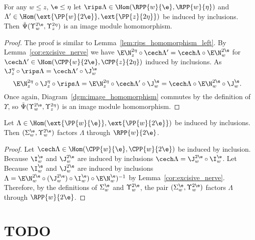 \begin{lemma}\label{lem:rips_homomorphism_right}
  For any $w\leq z$, $\e\leq\eta$ let $\rips\Lambda\in\Hom(\RPP{w}{\e},\RPP{w}{\eta})$ and $\Lambda'\in\Hom(\ext{\PP{w}{2\e}},\ext{\PP{z}{2\eta}})$ be induced by inclusions.
  Then $\tilde{\Psi}(\Upsilon_w^{2\e},\Upsilon_z^{2\eta})$ is an image module homomorphism.
\end{lemma}
\begin{proof}
  The proof is similar to Lemma~\ref{lem:rips_homomorphism_left}.
  By Lemma~\ref{cor:excisive_nerve} we have $\E\N_z^{2\eta} \circ\cech\Lambda'  = \cech \Lambda\circ \E\N_w^{2\e}$ for $\cech\Lambda'\in\Hom(\CPP{w}{2\e},\CPP{z}{2\eta})$ induced by inclusions.
  As $\J_z^\eta\circ \rips\Lambda = \cech\Lambda'\circ\J_w^\e$
  \[ \E\N_z^{2\eta}\circ \J_z^\eta\circ \rips\Lambda = \E\N_z^{2\eta}\circ\cech\Lambda'\circ\J_w^\e = \cech \Lambda\circ \E\N_w^{2\e}\circ\J_w^\e.\]
  Once again, Diagram~\ref{dgm:image_homomorphism} commutes by the definition of $\Upsilon$, so $\tilde{\Psi}(\Upsilon_w^{2\e},\Upsilon_z^{2\eta})$ is an image module homomorphism.
\end{proof}

\begin{lemma}\label{lem:weak_rips_left}
  Let $\Lambda\in\Hom(\ext{\PP{w}{\e}}, \ext{\PP{w}{2\e}})$ be induced by inclusions.
  Then $(\Sigma_w^\e, \Upsilon_w^{2\e})$ factors $\Lambda$ through $\RPP{w}{2\e}$.
\end{lemma}
\begin{proof}
  Let $\cech\Lambda\in\Hom(\CPP{w}{\e},\CPP{w}{2\e})$ be induced by inclusion.
  Because $\I_w^\e$ and $\J_w^{2\e}$ are induced by inclusions $\cech\Lambda = \J_w^{2\e}\circ \I_w^\e$.
  Let
  Because $\I_w^\e$ and $\J_w^{2\e}$ are induced by inclusions $\Lambda = \E\N_w^{2\e}\circ (\J_w^{2\e})\circ \I_w^\e)\circ \E\N_w^\e)^{-1}$ by Lemma~\ref{cor:excisive_nerve}.
  Therefore, by the definitions of $\Sigma_w^\e$ and $\Upsilon_w^{2\e}$, the pair $(\Sigma_w^\e, \Upsilon_w^{2\e})$ factors $\Lambda$ through $\RPP{w}{2\e}$.
\end{proof}

\section{TODO}

